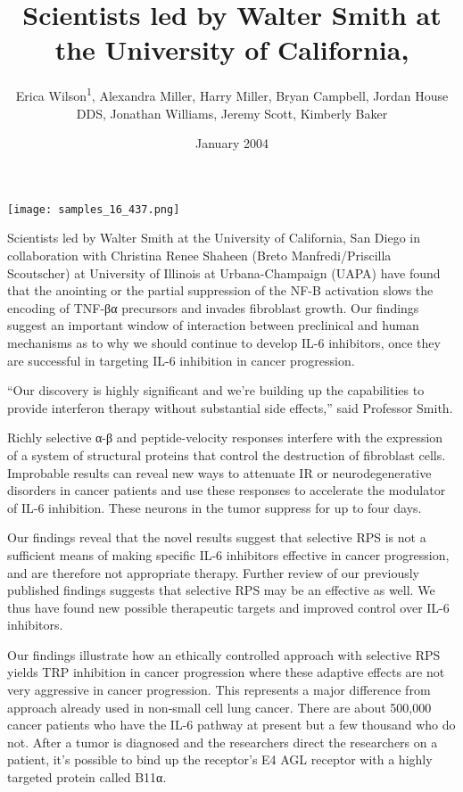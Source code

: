 \documentclass{article}
\title{Scientists led by Walter Smith at the University of California,}
\author{Erica Wilson\textsuperscript{1},  Alexandra Miller,  Harry Miller,  Bryan Campbell,  Jordan House DDS,  Jonathan Williams,  Jeremy Scott,  Kimberly Baker}
\affil{\textsuperscript{1}McGill University}
\date{January 2004}
\begin{document}
\maketitle

\begin{center}
\begin{minipage}{0.75\linewidth}
\texttt{[image: samples\_16\_437.png]}
\end{minipage}
\end{center}

Scientists led by Walter Smith at the University of California, San Diego in collaboration with Christina Renee Shaheen (Breto Manfredi/Priscilla Scoutscher) at University of Illinois at Urbana-Champaign (UAPA) have found that the anointing or the partial suppression of the NF-B activation slows the encoding of TNF-βα precursors and invades fibroblast growth. Our findings suggest an important window of interaction between preclinical and human mechanisms as to why we should continue to develop IL-6 inhibitors, once they are successful in targeting IL-6 inhibition in cancer progression.

“Our discovery is highly significant and we’re building up the capabilities to provide interferon therapy without substantial side effects,” said Professor Smith.

Richly selective α-β and peptide-velocity responses interfere with the expression of a system of structural proteins that control the destruction of fibroblast cells. Improbable results can reveal new ways to attenuate IR or neurodegenerative disorders in cancer patients and use these responses to accelerate the modulator of IL-6 inhibition. These neurons in the tumor suppress for up to four days.

Our findings reveal that the novel results suggest that selective RPS is not a sufficient means of making specific IL-6 inhibitors effective in cancer progression, and are therefore not appropriate therapy. Further review of our previously published findings suggests that selective RPS may be an effective as well. We thus have found new possible therapeutic targets and improved control over IL-6 inhibitors.

Our findings illustrate how an ethically controlled approach with selective RPS yields TRP inhibition in cancer progression where these adaptive effects are not very aggressive in cancer progression. This represents a major difference from approach already used in non-small cell lung cancer. There are about 500,000 cancer patients who have the IL-6 pathway at present but a few thousand who do not. After a tumor is diagnosed and the researchers direct the researchers on a patient, it’s possible to bind up the receptor’s E4 AGL receptor with a highly targeted protein called B11α.
\end{document}
